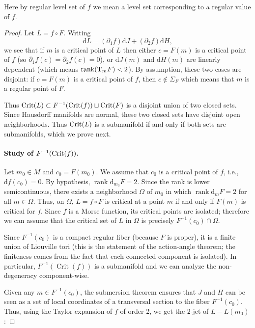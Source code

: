 \documentclass[11pt]{article}
\newcommand{\DD}{\mathrm{d}}
\begin{document}
Here by regular level set of $f$ we mean a level set corresponding to
a regular value of $f$.

\begin{proof} Let $L=f\circ F$. Writing
  \[
  \DD L =( \partial_1 f )\DD J + (\partial_2 f)\DD H,
  \]
  we see that if $m$ is a critical point of $L$ then either $c=F(m)$
  is a critical point of $f$ (so $\partial_1 f(c)=
  \partial_2f(c)=0$), or $\DD J(m)$ and $\DD H(m)$ are linearly
  dependent (which means $\operatorname{rank}({\rm T}_mF)<2$).  By
  assumption, these two cases are disjoint: if $c=F(m)$ is a critical
  point of $f$, then $c\not\in\Sigma_F$ which means that $m$ is a
  regular point of $F$.

  Thus $\textup{Crit}(L) \subset F^{-1}(\textup{Crit}(f))\sqcup
  \textup{Crit}(F)$ is a disjoint union of two closed sets. Since
  Hausdorff manifolds are normal, these two closed sets have disjoint
  open neighborhoods. Thus $\textup{Crit}(L)$ is a submanifold if and
  only if both sets are submanifolds, which we prove next.

  \paragraph{Study of $F^{-1}(\textup{Crit}(f))$.}

  Let $m_0\in M$ and $c_0=F(m_0)$. We assume that $c_0$ is a critical
  point of $f$, i.e., $\DD f(c_0)=0$. By hypothesis,
  $\operatorname{rank}\DD_{m_0}F=2$. Since the rank is lower
  semicontinuous, there exists a neighborhood $\Omega$ of $m_0$ in
  which $\operatorname{rank}\DD_{m}F=2$ for all $m \in \Omega$.
  Thus, on $\Omega$, $L=f\circ F$ is critical at a point $m$ if and
  only if $F(m)$ is critical for $f$. Since $f$ is a Morse function,
  its critical points are isolated; therefore we can assume that the
  critical set of $L$ in $\Omega$ is precisely
  $F^{-1}(c_0)\cap\Omega$.

  Since $F^{-1}(c_0)$ is a compact regular fiber (because $F$ is
  proper), it is a finite union of Liouville tori (this is the
  statement of the action-angle theorem; the finiteness comes from the
  fact that each connected component is isolated). In particular,
  $F^{-1}( \operatorname{Crit}(f))$ is a submanifold and we can
  analyze the non-degeneracy component-wise.

  Given any $m\in F^{-1}(c_0)$, the submersion theorem ensures that
  $J$ and $H$ can be seen as a set of local coordinates of a
  transversal section to the fiber $F^{-1}(c_0)$. Thus, using the
  Taylor expansion of $f$ of order 2, we get the 2-jet of $L-L(m_0)$:


\end{proof}
\end{document}

